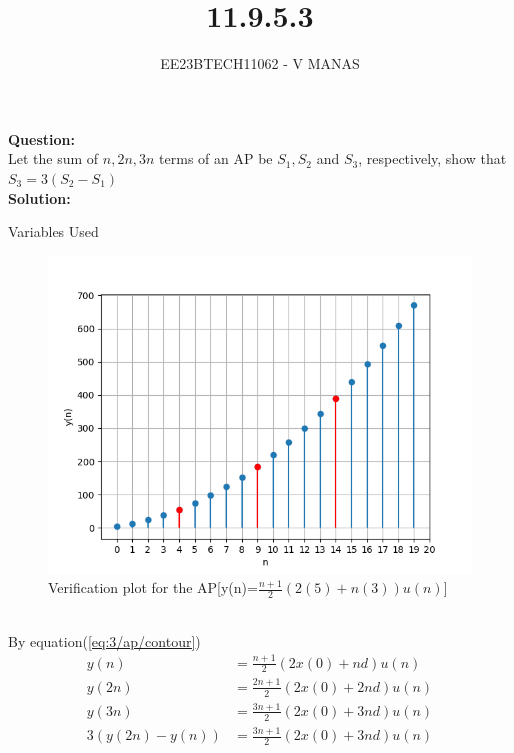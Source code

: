 \documentclass[journal,12pt,twocolumn]{IEEEtran}
\theoremstyle{remark}
\begin{document}

\vspace{3cm}

\title{11.9.5.3}
\author{EE23BTECH11062 - V MANAS}
\maketitle
\newpage

\bigskip
\textbf{Question:}\\Let the sum of $n,2n,3n$ terms of an AP be $S_1,S_2$ and $S_3$, respectively, show that $S_3=3(S_2-S_1)$\\
\textbf{Solution:}
\fi
\begin{table}[h]
    \centering
    
    \caption{Variables Used}
    \label{tab:table_11.9.5.3}
\end{table}
\begin{figure}[h]
    \centering
    \includegraphics[width=1.3\linewidth]{ncert-maths/11/9/5/3/figs/graph.png}
    \caption{Verification plot for the AP[y(n)=$\frac{n+1}{2}(2(5)+n(3))u(n)$]}
\end{figure}\\
By equation(\ref{eq:3/ap/contour})
\begin{align}
    y(n)&=\frac{n+1}{2}(2x(0)+nd)u(n)\\
    y(2n)&=\frac{2n+1}{2}(2x(0)+2nd)u(n)\\
    y(3n)&=\frac{3n+1}{2}(2x(0)+3nd)u(n)\\
    3(y(2n)-y(n))&=\frac{3n+1}{2}(2x(0)+3nd)u(n)
\end{align}

\end{document}
